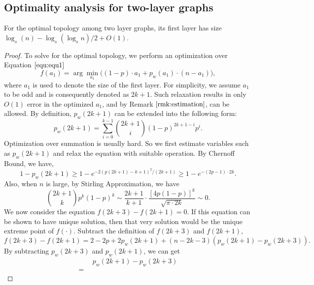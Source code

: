 \documentclass[a4paper,UKenglish]{lipics}
\theoremstyle{definition}
\begin{document}
\subsection{Optimality analysis for two-layer graphs} \label{subsec:two-layer optimal}
For the optimal topology among two layer graphs, its first layer has size $\log_{s}(n)-\log_s( \log_s n)/2 + O(1)$.
\begin{proof}
To solve for the optimal topology, we perform an optimization over Equation $\ref{equ:equ1}$
\begin{equation*}
	f(a_1) = \arg\min_{a_1} \Big( (1-p)\cdot a_1 + p_w(a_1)\cdot (n - a_1) \Big),
\end{equation*}
where $a_1$ is used to denote the size of the first layer.
For simplicity, we assume $a_1$ to be odd and is consequently denoted as $2k+1$.
Such relaxation results in only $O(1)$ error in the optimized $a_1$, and by Remark $\ref{rmk:estimation}$, can be allowed.
By definition, $p_w(2k+1)$ can be extended into the following form:
\begin{equation*}
	p_w(2k+1) 
= 
	\sum_{i=0}^{k-1} \binom{2k+1}{i} (1-p)^{2k+1-i} p^i.
\end{equation*}
Optimization over summation is usually hard.
So we first estimate variables such as $p_w(2k+1)$ and relax the equation with suitable operation.
By Chernoff Bound, we have,
\begin{equation*}
	1 - p_w(2k+1) 
\geq 
	1 - e^{-2(p(2k+1)-k+1)^2/(2k+1)}  
\geq 
 	1 - e^{-(2p-1)\cdot 2k}.
\end{equation*}
Also, when $n$ is large, by Stirling Approximation, we have
\begin{equation*}
	\binom{2k+1}{k}p^k(1-p)^k 
\sim 
	\frac{2k+1}{k+1} \cdot \frac{[4p(1-p)]^k}{\sqrt{\pi \cdot 2k}} 
\sim 
	0.
\end{equation*}
We now consider the equation $f(2k+3) - f(2k+1) = 0$. 
If this equation can be shown to have unique solution,
	then that very solution would be the unique extreme point of $f(\cdot)$.
Subtract the definition of $f(2k+3)$ and $f(2k+1)$,
\begin{equation} 
\label{equ:original}
 	f(2k+3) - f(2k+1)  
=	
	2 - 2p + 2p_w(2k+1) + (n - 2k - 3)(p_w(2k+1) - p_w(2k+3)). 
\end{equation}
By subtracting $p_w(2k+3)$ and $p_w(2k+1)$, we can get
\begin{equation}
\label{equ:subtract}
\begin{aligned}
& ~~
	p_w(2k+1) - p_w(2k+3)
\\ 
= &~~

\end{aligned}
\end{equation}
\end{proof}
\end{document}
